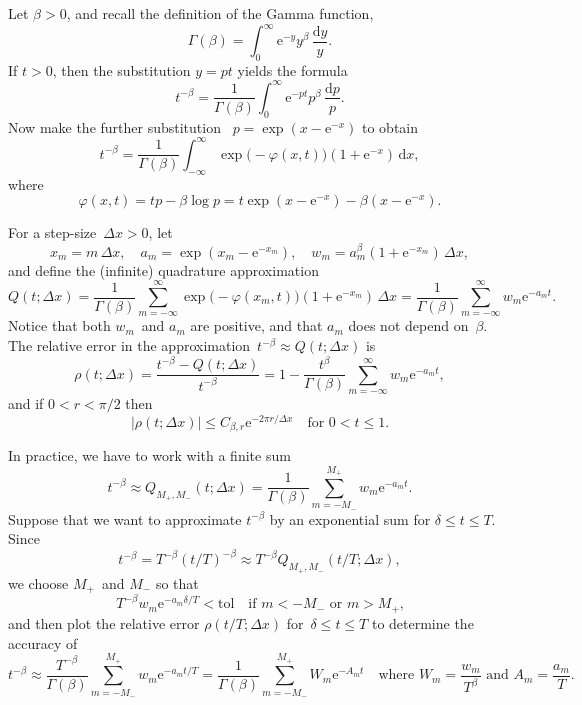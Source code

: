 \documentclass[a4paper,12pt]{article}
\newcommand{\ud}{\mathrm{d}}
\newcommand{\ue}{\mathrm{e}}
\begin{document}
Let $\beta>0$, and recall the definition of the Gamma function,
\[
\Gamma(\beta)=\int_0^\infty\ue^{-y}y^\beta\,\frac{\ud y}{y}.
\]
If $t>0$, then the substitution $y=pt$ yields the formula
\[
t^{-\beta}=\frac{1}{\Gamma(\beta)}\int_0^\infty
    \ue^{-pt}p^\beta\,\frac{\ud p}{p}.
\]
Now make the further substitution~\cite{McLean2018} $p=\exp(x-\ue^{-x})$ to
obtain
\[
t^{-\beta}=\frac{1}{\Gamma(\beta)}\int_{-\infty}^\infty
    \exp\bigl(-\varphi(x, t)\bigr)(1+\ue^{-x})\,\ud x,
\]
where
\[
\varphi(x,t)=tp-\beta\log p=t\exp(x-\ue^{-x})-\beta(x-\ue^{-x}).
\]

For a step-size~$\Delta x>0$, let
\[
x_m=m\,\Delta x,\quad
a_m=\exp(x_m-\ue^{-x_m}),\quad
w_m=a_m^\beta(1+\ue^{-x_m})\,\Delta x,
\]
and define the (infinite) quadrature approximation
\[
Q(t;\Delta x)=\frac{1}{\Gamma(\beta)}\sum_{m=-\infty}^\infty
    \exp\bigl(-\varphi(x_m, t)\bigr)(1+\ue^{-x_m})\,\Delta x
=\frac{1}{\Gamma(\beta)}\sum_{m=-\infty}^\infty w_m\ue^{-a_mt}.
\]
Notice that both $w_m$~and $a_m$ are positive, and that $a_m$ does not depend
on~$\beta$. The relative error in the
approximation~$t^{-\beta}\approx Q(t;\Delta x)$ is
\[
\rho(t;\Delta x)=\frac{t^{-\beta}-Q(t;\Delta x)}{t^{-\beta}}
=1-\frac{t^\beta}{\Gamma(\beta)}\sum_{m=-\infty}^\infty w_m\ue^{-a_mt},
\]
and if $0<r<\pi/2$ then~\cite[Theorem~4]{McLean2018}
\begin{equation}\label{eq: relative error}
|\rho(t;\Delta x)|\le C_{\beta,r}\ue^{-2\pi r/\Delta x}
    \quad\text{for $0<t\le 1$.}
\end{equation}

In practice, we have to work with a finite sum
\[
t^{-\beta}\approx Q_{M_+,M_-}(t;\Delta x)
    =\frac{1}{\Gamma(\beta)}\sum_{m=-M_-}^{M_+}w_m\ue^{-a_mt}.
\]
Suppose that we want to approximate $t^{-\beta}$ by an exponential sum for
$\delta\le t\le T$.  Since
\[
t^{-\beta}=T^{-\beta}(t/T)^{-\beta}\approx T^{-\beta}Q_{M_+,M_-}(t/T; \Delta x),
\]
we choose $M_+$~and $M_-$ so that
\[
T^{-\beta}w_m\ue^{-a_m\delta/T}<\mathrm{tol}\quad\text{if $m<-M_-$ or $m>M_+$,}
\]
and then plot the relative error $\rho(t/T; \Delta x)$ for~$\delta\le t\le T$
to determine the accuracy of
\[
t^{-\beta}\approx \frac{T^{-\beta}}{\Gamma(\beta)}\sum_{m=-M_-}^{M_+}
    w_m\ue^{-a_mt/T}=\frac{1}{\Gamma(\beta)}\sum_{m=-M_-}^{M_+}W_m\ue^{-A_mt}
\quad\text{where $W_m=\frac{w_m}{T^\beta}$ and $A_m=\frac{a_m}{T}$.}
\]
\end{document}
